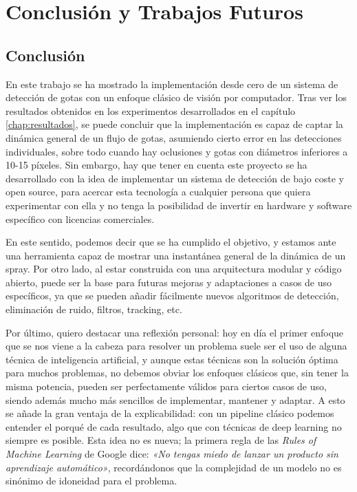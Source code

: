 \chapter{Conclusión y Trabajos Futuros}

\section{Conclusión}

En este trabajo se ha mostrado la implementación desde cero de un sistema de detección de gotas con un enfoque clásico de visión por computador. Tras ver los resultados obtenidos en los experimentos desarrollados en el capítulo \ref{chap:resultados}, se puede concluir que la implementación es capaz de captar la dinámica general de un flujo de gotas, asumiendo cierto error en las detecciones individuales, sobre todo cuando hay oclusiones y gotas con diámetros inferiores a 10-15 píxeles. Sin embargo, hay que tener en cuenta este proyecto se ha desarrollado con la idea de implementar un sistema de detección de bajo coste y open source, para acercar esta tecnología a cualquier persona que quiera experimentar con ella y no tenga la posibilidad de invertir en hardware y software específico con licencias comerciales.

En este sentido, podemos decir que se ha cumplido el objetivo, y estamos ante una herramienta capaz de mostrar una instantánea general de la dinámica de un spray. Por otro lado, al estar construida con una arquitectura modular y código abierto, puede ser la base para futuras mejoras y adaptaciones a casos de uso específicos, ya que se pueden añadir fácilmente nuevos algoritmos de detección, eliminación de ruido, filtros, tracking, etc.

Por último, quiero destacar una reflexión personal: hoy en día el primer enfoque que se nos viene a la cabeza para resolver un problema suele ser el uso de alguna técnica de inteligencia artificial, y aunque estas técnicas son la solución óptima para muchos problemas, no debemos obviar los enfoques clásicos que, sin tener la misma potencia, pueden ser perfectamente válidos para ciertos casos de uso, siendo además mucho más sencillos de implementar, mantener y adaptar. A esto se añade la gran ventaja de la explicabilidad: con un pipeline clásico podemos entender el porqué de cada resultado, algo que con técnicas de deep learning no siempre es posible. Esta idea no es nueva; la primera regla de las \textit{Rules of Machine Learning} de Google \cite{zinkevich_rules_ml} dice: \textit{«No tengas miedo de lanzar un producto sin aprendizaje automático»}, recordándonos que la complejidad de un modelo no es sinónimo de idoneidad para el problema.

